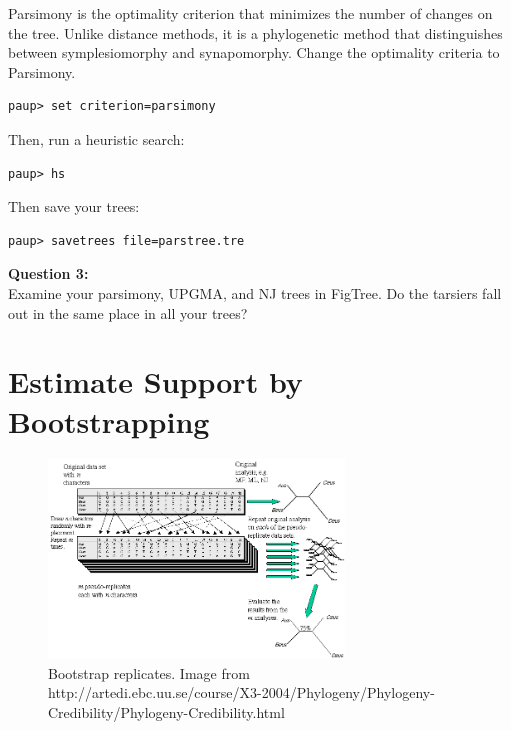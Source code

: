 \documentclass[11pt]{article}
\begin{document}
Parsimony is the optimality criterion that minimizes the number of changes on the tree. Unlike distance methods, it is a phylogenetic method that distinguishes between symplesiomorphy and synapomorphy. Change the optimality criteria to Parsimony.

\begin{verbatim}
paup> set criterion=parsimony
\end{verbatim}

Then, run a heuristic search:

\begin{verbatim}
paup> hs
\end{verbatim}

Then save your trees:

\begin{verbatim}
paup> savetrees file=parstree.tre
\end{verbatim}


\begin{framed}
\noindent
\textbf{Question 3:} \\
Examine your parsimony, UPGMA, and NJ trees in FigTree.
Do the tarsiers fall out in the same place in all your trees?
\end{framed}

\section{Estimate Support by Bootstrapping}

\begin{figure}
\centering
\includegraphics[width=0.7\textwidth]{bootstrap.png}
\caption{Bootstrap replicates. Image from \\ http://artedi.ebc.uu.se/course/X3-2004/Phylogeny/Phylogeny-Credibility/Phylogeny-Credibility.html}
\end{figure}
\end{document}
